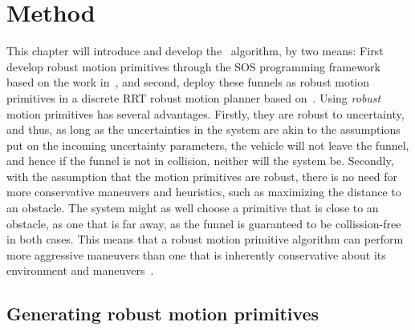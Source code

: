 \chapter{Method}

This chapter will introduce and develop the \rrtfunnel\ algorithm, by two means:
First develop robust motion primitives through the \ac{SOS} programming
framework based on the work in~\cite{majumdarFunnelLibrariesRealtime2017}, and
second, deploy these funnels as robust motion primitives in a discrete \ac{RRT}
robust motion planner based on~\cite{lavalleLav98cPdf}. Using \textit{robust}
motion primitives has several advantages. Firstly, they are robust to
uncertainty, and thus, as long as the uncertainties in the system are akin to
the assumptions put on the incoming uncertainty parameters, the vehicle will not
leave the funnel, and hence if the funnel is not in collision, neither will the
system be. Secondly, with the assumption that the motion primitives are robust,
there is no need for more conservative maneuvers and heuristics, such as
maximizing the distance to an obstacle. The system might as well choose a
primitive that is close to an obstacle, as one that is far away, as the funnel
is guaranteed to be collission-free in both cases. This means that a robust
motion primitive algorithm can perform more aggressive maneuvers than one that
is inherently conservative about its environment and
maneuvers~\cite{singhRobustOnlineMotion2017}.

\section{Generating robust motion primitives}

